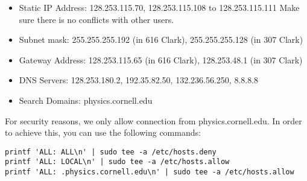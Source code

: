 \documentclass[12pt]{article}
\begin{document}
\begin{itemize}


\item Static IP Address: 128.253.115.70, 128.253.115.108 to 128.253.115.111
Make sure there is no conflicts with other users.
\item Subnet mask: 255.255.255.192 (in 616 Clark), 255.255.255.128 (in 307 Clark)
\item Gateway Address: 128.253.115.65 (in 616 Clark), 128.253.48.1 (in 307 Clark)
\item DNS Servers: 128.253.180.2, 192.35.82.50, 132.236.56.250, 8.8.8.8
\item Search Domains: physics.cornell.edu
\end{itemize}

For security reasons, we only allow connection from physics.cornell.edu.
In order to achieve this, you can use the following commands:
\begin{Verbatim}
printf 'ALL: ALL\n' | sudo tee -a /etc/hosts.deny
printf 'ALL: LOCAL\n' | sudo tee -a /etc/hosts.allow
printf 'ALL: .physics.cornell.edu\n' | sudo tee -a /etc/hosts.allow
\end{Verbatim}
\end{document}
